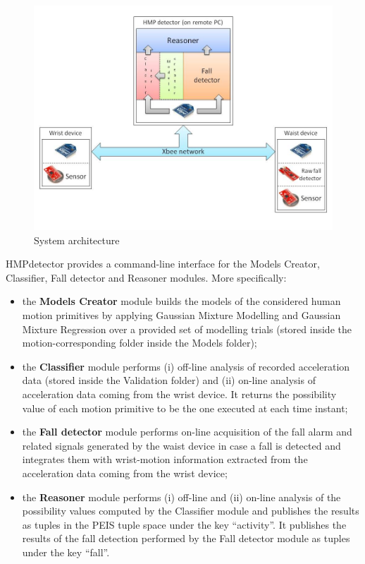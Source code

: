 \documentclass[10pt,a4paper]{report}
\begin{document}
\begin{figure}
\centering
\includegraphics[scale=0.45]{system_architecture.jpg}
\caption{System architecture}
\end{figure}

HMPdetector provides a command-line interface for the Models Creator, Classifier, Fall detector and Reasoner modules.
More specifically:
\begin{itemize}
\item the \textbf{Models Creator} module builds the models of the considered human motion primitives by applying Gaussian Mixture Modelling and Gaussian Mixture Regression over a provided set of modelling trials (stored inside the motion-corresponding folder inside the Models folder);
\item the \textbf{Classifier} module performs (i) off-line analysis of recorded acceleration data (stored inside the Validation folder) and (ii) on-line analysis of acceleration data coming from the wrist device. It returns the possibility value of each motion primitive to be the one executed at each time instant;
\item the \textbf{Fall detector} module performs on-line acquisition of the fall alarm and related signals generated by the waist device in case a fall is detected and integrates them with wrist-motion information extracted from the acceleration data coming from the wrist device;
\item the \textbf{Reasoner} module performs (i) off-line and (ii) on-line analysis of the possibility values computed by the Classifier module and publishes the results as tuples in the PEIS tuple space under the key “activity”. It publishes the results of the fall detection performed by the Fall detector module as tuples under the key “fall”.
\end{itemize}
\end{document}
